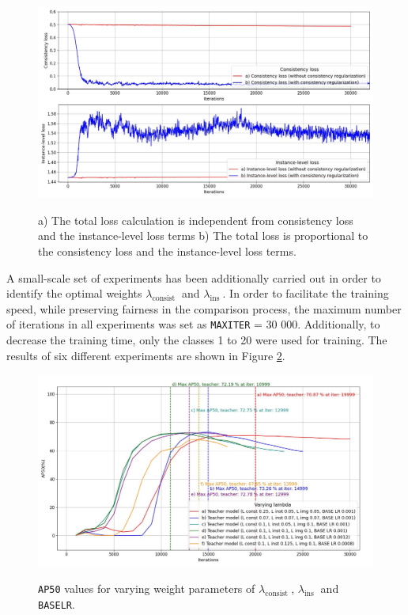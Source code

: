 \begin{figure}[htb]
	\begin{center}
		\includegraphics[width=14cm]{./consistency_loss.jpg}
	\end{center}
	\caption{a) The total loss calculation is independent from consistency loss and the instance-level loss terms b) The total loss is proportional to the consistency loss and the instance-level loss terms.}
	\begin{center}
		\label{myModel_constloss_total}
	\end{center}
\end{figure}

A small-scale set of experiments has been additionally carried out in order to identify the optimal weights $\lambda_{\text {consist }}$ and $\lambda_{\text {ins }}$. In order to facilitate the training speed, while preserving fairness in the  comparison process, the maximum number of iterations in all experiments was set as \texttt{MAX\textunderscore ITER} = 30 000. Additionally, to decrease the training time, only the classes 1 to 20 were used for training. The results of six different experiments are shown in Figure \ref{myModel_varying_params}.

\begin{figure}[htb]
	\begin{center}
		\includegraphics[width=14cm]{./AP50_varying_lambda.jpg}
	\end{center}
	\caption{\texttt{AP50} values for varying weight parameters of $\lambda_{\text {consist }}$, $\lambda_{\text {ins }}$ and \texttt{BASE\textunderscore LR}.}
	\begin{center}
		\label{myModel_varying_params}
	\end{center}
\end{figure}
\FloatBarrier  

